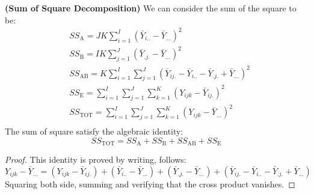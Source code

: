 \begin{proposition}{\textbf{(Sum of Square Decomposition)}}
    We can consider the sum of the square to be:
    \begin{equation*}
    \begin{aligned}
        &SS_\text{A} = JK\sum^I_{i=1}(\bar{Y}_{i..} - \bar{Y}_{...})^2 \\
        &SS_\text{B} = IK\sum^J_{j=1}(\bar{Y}_{.j.} - \bar{Y}_{...})^2 \\
        &SS_\text{AB} = K\sum^I_{i=1}\sum^J_{j=1} (\bar{Y}_{ij.} - \bar{Y}_{i..} - \bar{Y}_{.j.} + \bar{Y}_{...})^2 \\
        &SS_\text{E} = \sum^I_{i=1}\sum^J_{j=1}\sum^K_{k=1}(Y_{ijk} - \bar{Y}_{ij.})^2 \\
        &SS_\text{TOT} = \sum^I_{i=1}\sum^J_{j=1}\sum^K_{k=1}(Y_{ijk} - \bar{Y}_{...})^2 \\
    \end{aligned}
    \end{equation*}
    The sum of square satisfy the algebraic identity:
    \begin{equation*}
        SS_\text{TOT} = SS_\text{A} + SS_\text{B} + SS_\text{AB} + SS_\text{E}
    \end{equation*}
\end{proposition}
\begin{proof}
    This identity is proved by writing, follows:
    \begin{equation*}
        Y_{ijk} - \bar{Y}_{...} = (Y_{ijk} - \bar{Y}_{ij.}) + (\bar{Y}_{i..} - \bar{Y}_{...}) + (\bar{Y}_{.j.} - \bar{Y}_{...}) + (\bar{Y}_{ij.} - \bar{Y}_{i..} - \bar{Y}_{.j.} + \bar{Y}_{...})
    \end{equation*}
    Squaring both side, summing and verifying that the cross product vanishes. 
\end{proof}

